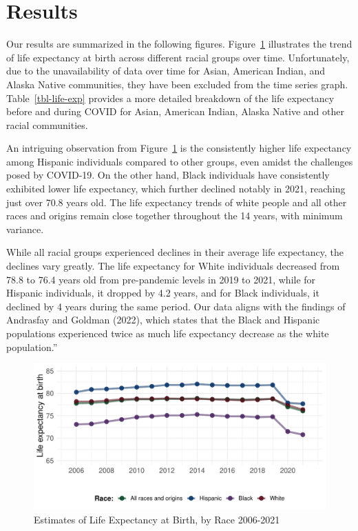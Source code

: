 \documentclass[
  letterpaper,
  DIV=11,
  numbers=noendperiod]{scrartcl}
\begin{document}
\hypertarget{results}{%
\section{Results}\label{results}}

Our results are summarized in the following figures.
Figure~\ref{fig-ELE} illustrates the trend of life expectancy at birth
across different racial groups over time. Unfortunately, due to the
unavailability of data over time for Asian, American Indian, and Alaska
Native communities, they have been excluded from the time series graph.
Table~\ref{tbl-life-exp} provides a more detailed breakdown of the life
expectancy before and during COVID for Asian, American Indian, Alaska
Native and other racial communities.

An intriguing observation from Figure~\ref{fig-ELE} is the consistently
higher life expectancy among Hispanic individuals compared to other
groups, even amidst the challenges posed by COVID-19. On the other hand,
Black individuals have consistently exhibited lower life expectancy,
which further declined notably in 2021, reaching just over 70.8 years
old. The life expectancy trends of white people and all other races and
origins remain close together throughout the 14 years, with minimum
variance.

While all racial groups experienced declines in their average life
expectancy, the declines vary greatly. The life expectancy for White
individuals decreased from 78.8 to 76.4 years old from pre-pandemic
levels in 2019 to 2021, while for Hispanic individuals, it dropped by
4.2 years, and for Black individuals, it declined by 4 years during the
same period. Our data aligns with the findings of Andrasfay and Goldman
(2022), which states that the Black and Hispanic populations experienced
twice as much life expectancy decrease as the white population.''

\begin{figure}

{\centering \includegraphics{paper_files/figure-pdf/fig-ELE-1.pdf}

}

\caption{\label{fig-ELE}Estimates of Life Expectancy at Birth, by Race
2006-2021}

\end{figure}
\end{document}
